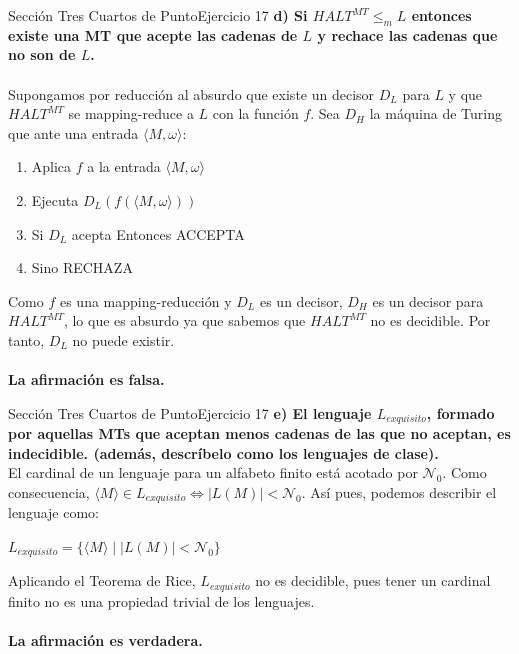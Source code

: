 \documentclass[10pt, envcountsect, presentation, aspectratio=169]{beamer}
\begin{document}
\begin{frame}{Sección Tres Cuartos de Punto}{Ejercicio 17}
    \textbf{d) Si $HALT^{MT} \le_m L$ entonces existe una MT  que acepte las cadenas de $L$ y rechace las cadenas que no son de $L$.}\\~\\    

    Supongamos por reducción al absurdo que existe un decisor $D_L$ para $L$ y que $HALT^{MT}$ se mapping-reduce a $L$ con la función $f$.
    Sea $D_H$ la máquina de Turing que ante una entrada $\langle M,\omega \rangle$:
    \begin{enumerate}[1.]
        \item Aplica $f$ a la entrada $\langle M,\omega \rangle$
        \item Ejecuta $D_L(f(\langle M,\omega \rangle))$
        \item Si $D_L$ acepta Entonces ACCEPTA
        \item Sino RECHAZA
    \end{enumerate}

    Como $f$ es una mapping-reducción y $D_L$ es un decisor, $D_H$ es un decisor para $HALT^{MT}$, lo que es absurdo ya que sabemos que $HALT^{MT}$ no es decidible.
    Por tanto, $D_L$ no puede existir.\\~\\

    \textbf{La afirmación es falsa.}
\end{frame}


\begin{frame}{Sección Tres Cuartos de Punto}{Ejercicio 17}
    \textbf{e) El lenguaje $L_{exquisito}$, formado por aquellas MTs que aceptan menos cadenas de las que no aceptan, es indecidible. (además, descríbelo como los lenguajes de clase).}\\
    El cardinal de un lenguaje para un alfabeto finito está acotado por $\mathcal{N}_0$. Como consecuencia, $\langle M \rangle \in L_{exquisito} \Leftrightarrow |L(M)|<\mathcal{N}_0$.
    Así pues, podemos describir el lenguaje como: 
    \begin{center}
        $L_{exquisito}=\{\langle M \rangle \mid |L(M)|< \mathcal{N}_0\}$
    \end{center}
    Aplicando el Teorema de Rice, $L_{exquisito}$ no es decidible, pues tener un cardinal finito no es una propiedad trivial de los lenguajes.\\~\\

    \textbf{La afirmación es verdadera.}
    
\end{frame}
\end{document}
